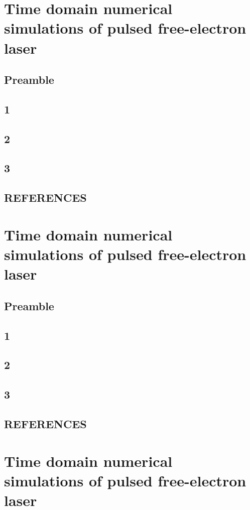 \documentclass[11pt, letterpaper]{article}
\begin{document}
\section{Time domain numerical simulations of pulsed free-electron laser}
	\subsection{Preamble}
	\subsection{1}
	\subsection{2}
	\subsection{3}
	\subsection{REFERENCES}

% 
%
\newpage
\section{Time domain numerical simulations of pulsed free-electron laser}
	\subsection{Preamble}
	\subsection{1}
	\subsection{2}
	\subsection{3}
	\subsection{REFERENCES}

% 
%
\newpage
\section{Time domain numerical simulations of pulsed free-electron laser}
\end{document}
